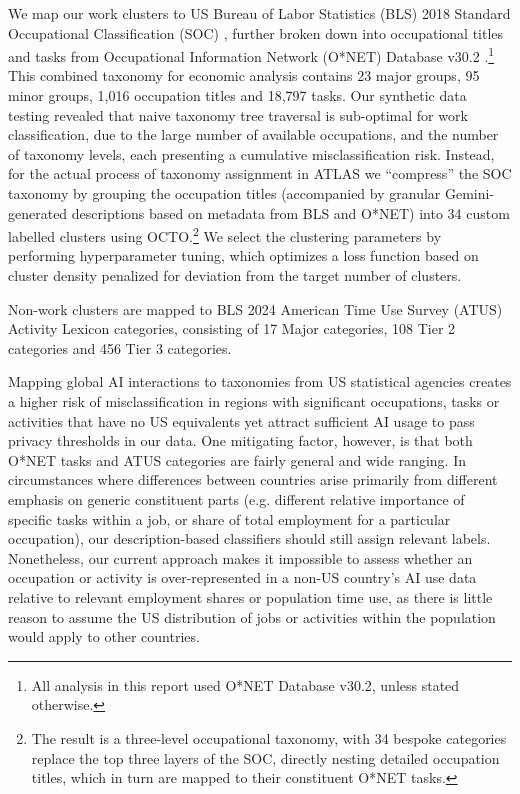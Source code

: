 \documentclass[11pt,a4paper]{article}
\begin{document}
We map our work clusters to US Bureau of Labor Statistics (BLS) 2018 Standard Occupational Classification (SOC) \citep{bls_soc_2018}, further broken down into occupational titles and tasks from Occupational Information Network (O*NET) Database v30.2 \citep{onet_30_2}.\footnote{All analysis in this report used O*NET Database v30.2, unless stated otherwise.} This combined taxonomy for economic analysis contains 23 major groups, 95 minor groups,  1,016 occupation titles and 18,797 tasks. Our synthetic data testing revealed that naive taxonomy tree traversal is sub-optimal for work classification, due to the large number of available occupations, and the number of taxonomy levels, each presenting a cumulative misclassification risk. Instead, for the actual process of taxonomy assignment in ATLAS we ``compress'' the SOC taxonomy by grouping the occupation titles (accompanied by granular Gemini-generated descriptions based on metadata from BLS and O*NET) into 34 custom labelled clusters using OCTO.\footnote{The result is a three-level occupational taxonomy, with 34 bespoke categories replace the top three layers of the SOC, directly nesting detailed occupation titles, which in turn are mapped to their constituent O*NET tasks.}  We select the clustering parameters by performing hyperparameter tuning, which optimizes a loss function based on cluster density penalized for deviation from the target number of clusters.

Non-work clusters are mapped to BLS 2024 American Time Use Survey (ATUS) Activity Lexicon \citep{bls_atus_lexicon_2024} categories, consisting of 17 Major categories, 108 Tier 2 categories and 456 Tier 3 categories.

Mapping global AI interactions to taxonomies from US statistical agencies creates a higher risk of misclassification in regions with significant occupations, tasks or activities that have no US equivalents yet attract sufficient AI usage to pass privacy thresholds in our data. One mitigating factor, however, is that both O*NET tasks and ATUS categories are fairly general and wide ranging. In circumstances where differences between countries arise primarily from different emphasis on generic constituent parts (e.g. different relative importance of specific tasks within a job, or share of total employment for a particular occupation), our description-based classifiers should still assign relevant labels. Nonetheless, our current approach makes it impossible to assess whether an occupation or activity is over-represented in a non-US country’s AI use data relative to relevant employment shares or population time use, as there is little reason to assume the US distribution of jobs or activities within the population would apply to other countries. 
\end{document}
